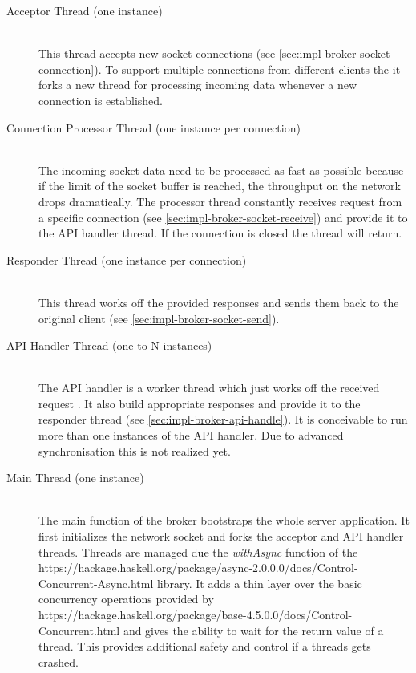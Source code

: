\begin{description}
\item[Acceptor Thread (one instance)] \hfill \\
    This thread accepts new socket connections (see
    \ref{sec:impl-broker-socket-connection}). To support multiple connections from
    different clients the it forks a new thread for processing incoming data
    whenever a new connection is established. 

\item[Connection Processor Thread (one instance per connection)] \hfill \\
    The incoming socket data need to be processed as fast as possible because if the
    limit of the socket buffer is reached, the throughput on the network drops
    dramatically. The processor thread constantly receives request
    from a specific connection (see \ref{sec:impl-broker-socket-receive}) and
    provide it to the API handler thread. If the connection is closed the
    thread will return. 

\item[Responder Thread (one instance per connection)] \hfill \\
    This thread works off the provided responses and sends them back to the original
    client (see \ref{sec:impl-broker-socket-send}).  \item [API Handler Thread (one to N instances)] \hfill
    \\
    The API handler is a worker thread which just works off the received request . It
    also build appropriate responses and provide it to the responder thread
    (see \ref{sec:impl-broker-api-handle}). It is conceivable to run more than
    one instances of the API handler. Due to advanced synchronisation this is
    not realized yet.
\item [Main Thread (one instance)] \hfill \\
    The main function of the broker bootstraps the whole server application. It first
    initializes the network socket and forks the acceptor and API
    handler threads. Threads are managed due the \textit{withAsync} function of
    the 
    {https://hackage.haskell.org/package/async-2.0.0.0/docs/Control-Concurrent-Async.html}
    library. It adds a thin layer over the basic concurrency operations provided
    by 
    {https://hackage.haskell.org/package/base-4.5.0.0/docs/Control-Concurrent.html}
    and gives the ability to wait for the return value of a thread. This
    provides additional safety and control if a threads gets crashed. 
\end{description}

